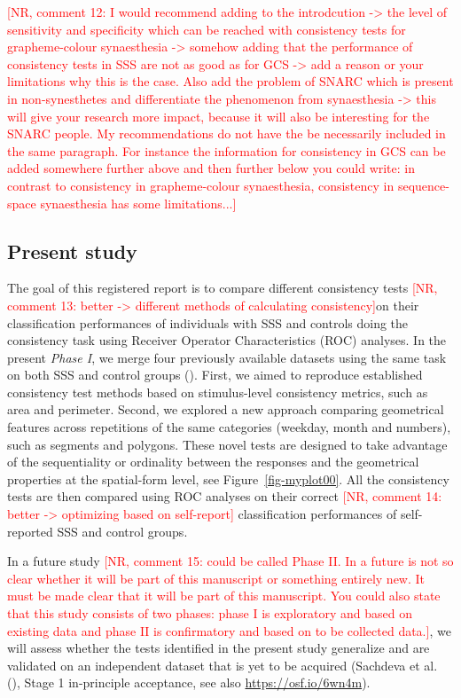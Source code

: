\documentclass[
  man,
  longtable,
  a4paper,
  nolmodern,
  notxfonts,
  notimes,
  colorlinks=true,linkcolor=blue,citecolor=blue,urlcolor=blue]{apa7}
\begin{document}
\textcolor{red}{[NR, comment 12: I would recommend adding to the introdcution -> the level of sensitivity and specificity which can be reached with consistency tests for grapheme-colour synaesthesia -> somehow adding that the performance of consistency tests in SSS are not as good as for GCS -> add a reason or your limitations why this is the case. Also add the problem of SNARC which is present in non-synesthetes and differentiate the phenomenon from synaesthesia -> this will give your research more impact, because it will also be interesting for the SNARC people. My recommendations do not have the be necessarily included in the same paragraph. For instance the information for consistency in GCS can be added somewhere further above and then further below you could write: in contrast to consistency in grapheme-colour synaesthesia, consistency in sequence-space synaesthesia has some limitations...]}

\subsection{Present study}\label{present-study}

The goal of this registered report is to compare different consistency
tests
\textcolor{red}{[NR, comment 13: better -> different methods of calculating consistency]}on
their classification performances of individuals with SSS and controls
doing the consistency task using Receiver Operator Characteristics (ROC)
analyses. In the present \emph{Phase I}, we merge four previously
available datasets using the same task on both SSS and control groups
(). First, we aimed to reproduce
established consistency test methods based on stimulus-level consistency
metrics, such as area and perimeter. Second, we explored a new approach
comparing geometrical features across repetitions of the same categories
(weekday, month and numbers), such as segments and polygons. These novel
tests are designed to take advantage of the sequentiality or ordinality
between the responses and the geometrical properties at the spatial-form
level, see Figure~\ref{fig-myplot00}. All the consistency tests are then
compared using ROC analyses on their correct
\textcolor{red}{[NR, comment 14: better -> optimizing based on self-report]}
classification performances of self-reported SSS and control groups.

In a future study
\textcolor{red}{[NR, comment 15: could be called Phase II. In a future is not so clear whether it will be part of this manuscript or something entirely new. It must be made clear that it will be part of this manuscript. You could also state that this study consists of two phases: phase I is exploratory and based on existing data and phase II is confirmatory and based on to be collected data.]},
we will assess whether the tests identified in the present study
generalize and are validated on an independent dataset that is yet to be
acquired (Sachdeva et al. (), Stage 1
in-principle acceptance, see also \url{https://osf.io/6wn4m}).
\end{document}
